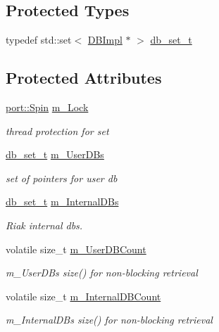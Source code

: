 \subsection*{Protected Types}
\begin{DoxyCompactItemize}
\item 
typedef std\+::set$<$ \hyperlink{classleveldb_1_1_d_b_impl}{D\+B\+Impl} $\ast$ $>$ \hyperlink{classleveldb_1_1_d_b_list_impl_a488f9397e7f20c6625bdc23646e475e9}{db\+\_\+set\+\_\+t}
\end{DoxyCompactItemize}
\subsection*{Protected Attributes}
\begin{DoxyCompactItemize}
\item 
\hyperlink{namespaceleveldb_1_1port_a3017c82209c2da44f142ef633e012149}{port\+::\+Spin} \hyperlink{classleveldb_1_1_d_b_list_impl_ad99465e8e924322b5f73588f37525998}{m\+\_\+\+Lock}
\begin{DoxyCompactList}\small\item\em thread protection for set \end{DoxyCompactList}\item 
\hyperlink{classleveldb_1_1_d_b_list_impl_a488f9397e7f20c6625bdc23646e475e9}{db\+\_\+set\+\_\+t} \hyperlink{classleveldb_1_1_d_b_list_impl_a22538888b46611bcca4079e73b703027}{m\+\_\+\+User\+D\+Bs}
\begin{DoxyCompactList}\small\item\em set of pointers for user db \end{DoxyCompactList}\item 
\hyperlink{classleveldb_1_1_d_b_list_impl_a488f9397e7f20c6625bdc23646e475e9}{db\+\_\+set\+\_\+t} \hyperlink{classleveldb_1_1_d_b_list_impl_a72495cfae3cb9ecf946348fd4c4605ff}{m\+\_\+\+Internal\+D\+Bs}
\begin{DoxyCompactList}\small\item\em Riak internal dbs. \end{DoxyCompactList}\item 
volatile size\+\_\+t \hyperlink{classleveldb_1_1_d_b_list_impl_aa56c84401c4f4b7e9f75059355af3b1b}{m\+\_\+\+User\+D\+B\+Count}
\begin{DoxyCompactList}\small\item\em m\+\_\+\+User\+D\+Bs size() for non-\/blocking retrieval \end{DoxyCompactList}\item 
volatile size\+\_\+t \hyperlink{classleveldb_1_1_d_b_list_impl_a4a3070e45b25fb23ee58ad4b8f034e85}{m\+\_\+\+Internal\+D\+B\+Count}
\begin{DoxyCompactList}\small\item\em m\+\_\+\+Internal\+D\+Bs size() for non-\/blocking retrieval \end{DoxyCompactList}\end{DoxyCompactItemize}


